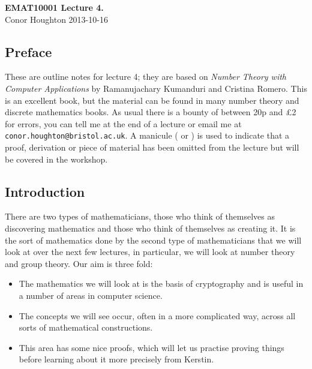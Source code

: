 \documentclass[12pt]{article}
\begin{document}
\begin{center}
{\bf EMAT10001 Lecture 4.}\\[1cm]{} Conor Houghton 2013-10-16
\end{center}
\subsection*{Preface} 
These are outline notes for lecture 4; they are based on \emph{Number
  Theory with Computer Applications} by Ramanujachary Kumanduri and
Cristina Romero. This is an excellent book, but the material can be
found in many number theory and discrete mathematics books. As usual
there is a bounty of between 20p and \pounds 2 for errors, you can
tell me at the end of a lecture or email me at
\texttt{conor.houghton{@}bristol.ac.uk}. A manicule (\HandLeft{} or \HandRight) is used to
indicate that a proof, derivation or piece of material has been
omitted from the lecture but will be covered in the workshop.

\subsection*{Introduction}
There are two types of mathematicians, those who think of themselves
as discovering mathematics and those who think of themselves as
creating it. It is the sort of mathematics done by the second type of
mathematicians that we will look at over the next few lectures, in
particular, we will look at number theory and group theory. Our aim is
three fold:
\begin{itemize}
\item The mathematics we will look at is the basis of cryptography and is useful in a number of areas in computer science.
\item The concepts we will see occur, often in a more complicated way, across all sorts of mathematical constructions.
\item This area has some nice proofs, which will let us practise proving things before learning about it more precisely from Kerstin.
\end{itemize}
\end{document}
